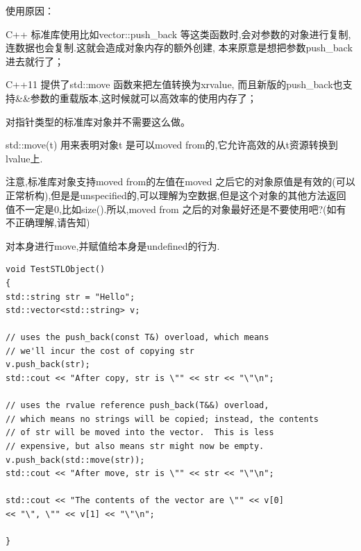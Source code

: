 使用原因：

C++ 标准库使用比如vector::push\_back 等这类函数时,会对参数的对象进行复制,连数据也会复制.这就会造成对象内存的额外创建, 本来原意是想把参数push\_back进去就行了；

C++11 提供了std::move 函数来把左值转换为xrvalue, 而且新版的push\_back也支持\&\&参数的重载版本,这时候就可以高效率的使用内存了；

对指针类型的标准库对象并不需要这么做。

std::move(t) 用来表明对象t 是可以moved from的,它允许高效的从t资源转换到lvalue上.

注意,标准库对象支持moved from的左值在moved 之后它的对象原值是有效的(可以正常析构),但是是unspecified的,可以理解为空数据,但是这个对象的其他方法返回值不一定是0,比如size().所以,moved from 之后的对象最好还是不要使用吧?(如有不正确理解,请告知)

对本身进行move,并赋值给本身是undefined的行为.

\begin{lstlisting}
void TestSTLObject()
{
std::string str = "Hello";
std::vector<std::string> v;

// uses the push_back(const T&) overload, which means
// we'll incur the cost of copying str
v.push_back(str);
std::cout << "After copy, str is \"" << str << "\"\n";

// uses the rvalue reference push_back(T&&) overload,
// which means no strings will be copied; instead, the contents
// of str will be moved into the vector.  This is less
// expensive, but also means str might now be empty.
v.push_back(std::move(str));
std::cout << "After move, str is \"" << str << "\"\n";

std::cout << "The contents of the vector are \"" << v[0]
<< "\", \"" << v[1] << "\"\n";

}
\end{lstlisting}

